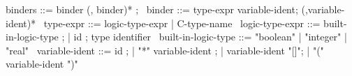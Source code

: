 \begin{syntax}
  binders ::= binder (, binder)* ;
  \
  binder ::= type-expr variable-ident;
             (,variable-ident)*
  \
  type-expr ::= logic-type-expr | C-type-name
  \
  logic-type-expr ::= built-in-logic-type ;
  | id ; type identifier
  \
  built-in-logic-type ::= "boolean" | "integer" | "real"
  \
  variable-ident ::= id ;
  | "*" variable-ident ;
  | variable-ident "[]";
  | "(" variable-ident ")"
\end{syntax}
